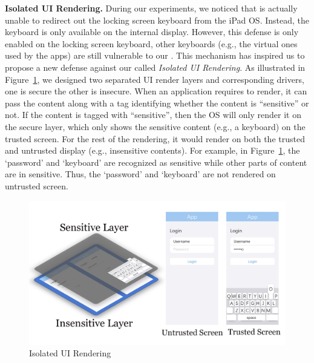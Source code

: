 \textbf{Isolated \ac{UI} Rendering.} During our experiments, we noticed that \tool
is actually unable to redirect out the locking screen keyboard from the iPad
OS. Instead, the keyboard is only available on the internal display. However,
this defense is only enabled on the locking screen keyboard, other keyboards
(e.g., the virtual ones used by the apps) are still vulnerable to our \tool.
This mechanism has inspired us to propose a new defense against our \tool
called \emph{Isolated \ac{UI} Rendering}. As illustrated in
Figure~\ref{fig:isolated_ui}, we designed two separated \ac{UI} render layers and corresponding drivers, one
is secure the other is insecure. When an application requires to render, it can
pass the content along with a tag identifying whether the content is
``sensitive'' or not. If the content is tagged with ``sensitive'', then the OS
will only render it on the secure layer, which only shows the sensitive content
(e.g., a keyboard) on the trusted screen. For the rest of the rendering, it
would render on both the trusted and untrusted display (e.g., insensitive
contents).
For example, in Figure~\ref{fig:isolated_ui}, the `password' and `keyboard' are recognized as sensitive while other parts of content are in sensitive. Thus, the `password' and `keyboard' are not rendered on untrusted screen.

\begin{figure}[t]
	\centering
	\includegraphics[width=\linewidth]{./Figs/isolated_ui.png}
	\caption{Isolated \ac{UI} Rendering}%
	\label{fig:isolated_ui}
\end{figure}
